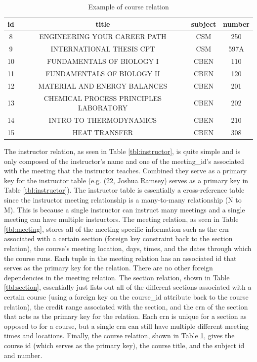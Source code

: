 \documentclass[12pt,letterpaper,titlepage]{article}
\begin{document}
\begin{table}[H]
\centering
\begin{tabular}{|c|c|c|c|}
\hline
id & title & subject & number \\ \hline
8 & ENGINEERING YOUR CAREER PATH & CSM & 250 \\ \hline
9 & INTERNATIONAL THESIS CPT & CSM & 597A \\ \hline
10 & FUNDAMENTALS OF BIOLOGY I & CBEN & 110 \\ \hline
11 & FUNDAMENTALS OF BIOLOGY II & CBEN & 120 \\ \hline
12 & MATERIAL AND ENERGY BALANCES & CBEN & 201 \\ \hline
13 & CHEMICAL PROCESS PRINCIPLES LABORATORY & CBEN & 202 \\ \hline
14 & INTRO TO THERMODYNAMICS & CBEN & 210 \\ \hline
15 & HEAT TRANSFER & CBEN & 308 \\ \hline
\end{tabular}
\caption{\label{tbl:course}Example of course relation}
\end{table}

The instructor relation, as seen in Table \ref{tbl:instructor}, is quite simple and is only composed of the instructor's name and one of the meeting\_id's associated with the meeting that the instructor teaches. Combined they serve as a primary key for the instructor table (e.g. (22, Joshua Ramsey) serves as a primary key in Table \ref{tbl:instructor}). The instructor table is essentially a cross-reference table since the instructor meeting relationship is a many-to-many relationship (N to M). This is because a single instructor can instruct many meetings and a single meeting can have multiple instructors. The meeting relation, as seen in Table \ref{tbl:meeting}, stores all of the meeting specific information such as the crn associated with a certain section (foreign key constraint back to the section relation), the course's meeting location, days, times, and the dates through which the course runs. Each tuple in the meeting relation has an associated id that serves as the primary key for the relation. There are no other foreign dependencies in the meeting relation. The section relation, shown in Table \ref{tbl:section}, essentially just lists out all of the different sections associated with a certain course (using a foreign key on the course\_id attribute back to the course relation), the credit range associated with the section, and the crn of the section that acts as the primary key for the relation. Each crn is unique for a section as opposed to for a course, but a single crn can still have multiple different meeting times and locations. Finally, the course relation, shown in Table \ref{tbl:course}, gives the course id (which serves as the primary key), the course title, and the subject id and number.
\end{document}
